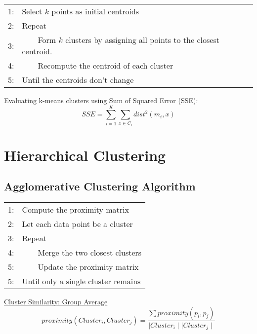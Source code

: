 \begin{table}[h!]
\begin{tabular}{r p{12cm}}
\hline
    1: & Select $k$ points as initial centroids\\
    2: & Repeat \\
    3: & \ \ \ \ Form $k$ clusters by assigning all points to the closest centroid. \\
    4: & \ \ \ \ Recompute the centroid of each cluster \\
    5: & Until the centroids don't change \\
\hline
\end{tabular}
\end{table}
\par \noindent Evaluating k-means clusters using Sum of Squared Error (SSE):
$$SSE = \sum_{i=1}^{K} \sum_{x \in C_i} dist^{2}(m_i, x) $$

\section{Hierarchical Clustering}

\subsection{Agglomerative Clustering Algorithm}

\begin{table}[h!]
\begin{tabular}{r p{12cm}}
\hline
    1: & Compute the proximity matrix\\
    2: & Let each data point be a cluster \\
    3: & Repeat \\
    4: & \ \ \ \ Merge the two closest clusters \\
    5: & \ \ \ \ Update the proximity matrix \\
    5: & Until only a single cluster remains \\
\hline
\end{tabular}
\end{table} \noindent
\underline{Cluster Similarity: Group Average} \\
$$proximity(Cluster_i,Cluster_j)=\frac{\sum proximity(p_i, p_j)}{\mid Cluster_i \mid \mid Cluster_j \mid}$$

\clearpage
